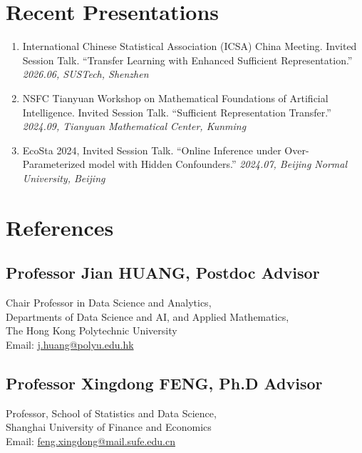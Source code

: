 \documentclass{resume}
\begin{document}
\section{\bf Recent Presentations} 

\begin{enumerate}
	\item  International Chinese Statistical Association (ICSA) China Meeting.  Invited Session Talk. ``Transfer Learning with Enhanced Sufficient Representation.'' 
	\emph{2026.06, SUSTech, Shenzhen}


	\item   NSFC Tianyuan Workshop on Mathematical Foundations of Artificial Intelligence. Invited Session Talk. ``Sufficient Representation Transfer.'' 
	\emph{2024.09, Tianyuan Mathematical Center, Kunming}


	\item    EcoSta 2024, Invited Session Talk. ``Online Inference  under Over-Parameterized model with Hidden Confounders.'' 
	\emph{2024.07, Beijing Normal University, Beijing}


\end{enumerate}



\section{\bf References}

\noindent
\begin{minipage}[t]{0.48\textwidth}
\subsection{Professor Jian HUANG, {\small\color{gray}Postdoc Advisor}}
Chair Professor in Data Science and Analytics,\\
Departments of Data Science and AI, and Applied Mathematics,\\
The Hong Kong Polytechnic University\\
Email: \url{j.huang@polyu.edu.hk}
\end{minipage}%
\hfill
\begin{minipage}[t]{0.48\textwidth}
\subsection{Professor Xingdong FENG, {\small\color{gray}Ph.D Advisor}}
Professor, School of Statistics and Data Science,\\
Shanghai University of Finance and Economics\\
Email: \url{feng.xingdong@mail.sufe.edu.cn}
\end{minipage}
\end{document}

